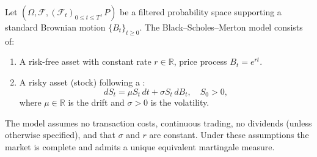 \begin{definition} \label{definition:black_scholes_merton_market_model_with_geometric_brownian_motion}
Let $(\Omega, \mathcal{F}, (\mathcal{F}_t)_{0 \leq t \leq T}, P)$ be a filtered probability space supporting a standard Brownian motion $\{B_t\}_{t \geq 0}$. The Black--Scholes--Merton model consists of:

\begin{enumerate}
    \item A risk-free asset with constant rate $r \in \mathbb{R}$, price process $B_t = e^{rt}$.
    \item A risky asset (stock) following a :
    $$dS_t = \mu S_t \, dt + \sigma S_t \, dB_t, \quad S_0 > 0,$$
    where $\mu \in \mathbb{R}$ is the drift and $\sigma > 0$ is the volatility.
\end{enumerate}

The model assumes no transaction costs, continuous trading, no dividends (unless otherwise specified), and that $\sigma$ and $r$ are constant. Under these assumptions the market is complete and admits a unique equivalent martingale measure.
\end{definition}